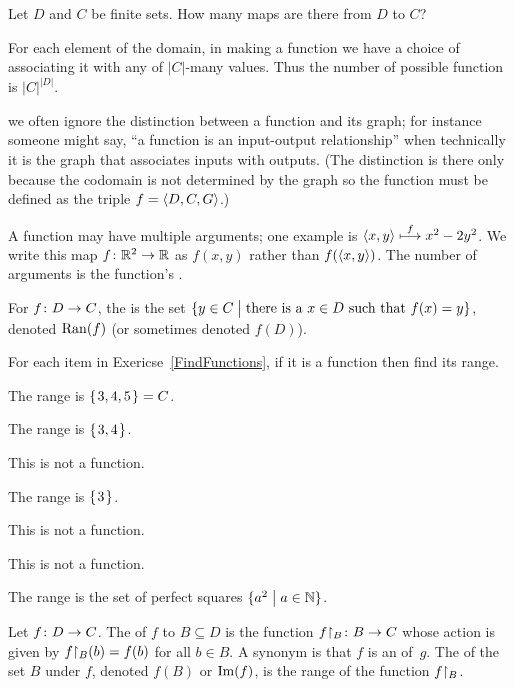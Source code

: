 \documentclass{ibl}  %
\begin{document}
\begin{ex}
Let $D$ and $C$ be finite sets.
How many maps are there from $D$ to $C$?
\begin{ans}
For each element of the domain, in making a function we have a choice 
of associating it with any of $|C|$-many values.
Thus the number of possible function is $|C|^{|D|}$.
\end{ans}
\end{ex}

\remark
we often ignore the distinction between a function and its graph; for instance 
someone might say, ``a function is an input-output relationship'' when 
technically it is the graph that associates inputs with outputs.
(The distinction is there only because the codomain is not determined
by the graph so the function must be 
defined as the triple $f=\langle D,C,G\rangle$.)

A function may have multiple arguments; one example is 
$\langle x,y\rangle\stackrel{f}{\longmapsto}x^2-2y^2$.
We write this map $\mbox{$f\colon \mathbb{R}^2\to \mathbb{R}$}$ as 
$f(x,y)$ rather than
$f(\langle x,y\rangle)$.
The number of arguments is the function's .

\begin{df}
For $\mbox{$f\colon D\to C$}$,
the  is the set
$\{y\in C \bigm| \text{there is a $x\in D$ such that $f(x)=y$}\}$,
denoted $\operatorname{Ran}(f)$ (or sometimes denoted $f(D)$).
\end{df}

\begin{ex}
For each item in Exericse~\ref{FindFunctions}, 
if it is a function then find its range.  
\begin{ans}
\begin{items}
\item The range is $\mbox{$\{\hspace{0.1em}3,4,5\hspace{0.1em}\}$}=C$.    
\item The range is $\mbox{$\{\hspace{0.1em}3,4\hspace{0.1em}\}$}$.
\item This is not a function.   
\item The range is $\mbox{$\{\hspace{0.1em}3\hspace{0.1em}\}$}$.
\item This is not a function.   
\item This is not a function.   
\item The range is the set of perfect squares $\{a^2 \bigm| a\in\mathbb{N}\}$.   
\end{items}
\end{ans}
\end{ex}

\begin{df}
Let $\mbox{$f\colon D\to C$}$.
The  of $f$ to $B\subseteq D$ is
the function $\mbox{${f}\mathord\upharpoonright_{B}\colon B\to C$}$ whose action is given by 
${f}\mathord\upharpoonright_{B}(b)=f(b)$ for all $b\in B$.
A synonym is that
$f$ is an  of~$g$.
The  of the set $B$ under $f$, 
denoted $f(B)$ or $\operatorname{Im}(f)$,
is the range of the function ${f}\mathord\upharpoonright_{B}$.
\end{df}
\end{document}
